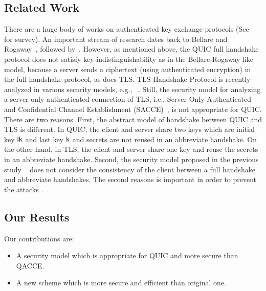 \subsection{Related Work} \label{sec:Related Work}
There are a huge body of works on authenticated key
exchange protocols (See~\cite{CK01:AKE} for survey).
An important stream of research dates back to Bellare
and Rogaway~\cite{BR93:AKE}, followed by~\cite{DB96,
Blei98,JMDP00,JB02,EK09,KK05:TLS,KCRE08,SMOAJ08,KTT11,
Kraw01}.
However, as mentioned above, the QUIC full handshake
protocol does not satisfy key-indistinguishability as
in the Bellare-Rogaway like model, because a server
sends a ciphertext (using authenticated encryption) in
the full handshake protocol, as does TLS.
TLS Handshake Protocol is recently analyzed in various
security models, e.g., ~\cite{JKSS12:ACCE,KPW13:SACCE,
FS13:ACCE,GKS13:RACCE,BDKSS14:SSH,BFKPSB14:TLS}.
Still, the security model for analyzing a server-only
authenticated connection of TLS, i.e., Server-Only
Authenticated and Confidential Channel Establishment
(SACCE)~\cite{KPW13:SACCE}, is not appropriate for QUIC.
There are two reasons. First, the abstract model of
handshake between QUIC and TLS is different. In QUIC,
the client and server share two keys which are initial
key $\mathsf{ik}$ and last key $\mathsf{k}$ and secrets are not
reused in an abbreviate handshake. On the other hand,
in TLS, the client and server share one key and reuse
the secrets in an abbreviate handshake. Second, the
security model proposed in the previous study
~\cite{FG14:QUIC,LJBN15:QUIC} does not
consider the consistency of the client between a full
handshake and abbreviate handshakes.
The second reasons is important in order to prevent the
attacks \cite{LJBN15:QUIC}.

\subsection{Our Results} \label{sec:proposal}

Our contributions are:
\begin{itemize}
 \item{A security model which is appropriate for QUIC
 and more secure than QACCE.}

 \item{A new scheme which is more secure and efficient
 than original one.}
\end{itemize}

